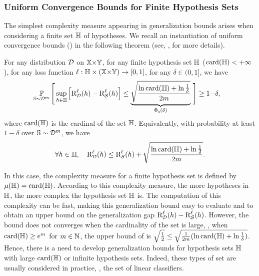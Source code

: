 \subsubsection{Uniform Convergence Bounds for Finite Hypothesis Sets}

The simplest complexity measure appearing in generalization bounds arises when considering a finite set $\mathbb{H}$ of hypotheses.
We recall an instantiation of uniform convergence bounds () in the following theorem (see, \eg, \citet{MohriRostamizadehTalwalkar2012} for more details).

\begin{theorem} For any distribution $\mathcal{D}$ on $\mathbb{X}{\times}\mathbb{Y}$, for any finite hypothesis set $\mathbb{H}$ ($\operatorname{card}(\mathbb{H})<+\infty$), for any loss function $\ell: \mathbb{H}\times(\mathbb{X}{\times}\mathbb{Y})\to [0,1]$, for any $\delta\in(0,1]$, we have 
\begin{align*}
    &\operatorname*{\mathbb{P}}_{\mathbb{S}\sim\mathcal{D}^{m}}\Bigg[\sup_{h\in\mathbb{H}}\left[\text{R}^{\ell}_{\mathcal{D}}(h)-\text{R}^{\ell}_{\mathcal{S}}(h)\right] \le  \underbrace{\sqrt{\frac{\ln\operatorname{card}(\mathbb{H})+\ln\frac{1}{\delta}}{2m}}}_{\Phi_{{\tt u}}(\delta)}\,\Bigg] \ge 1{-}\delta,
\end{align*}
where $\operatorname{card}(\mathbb{H})$ is the cardinal of the set $\mathbb{H}$.
Equivalently, with probability at least $1{-}\delta$ over $\mathbb{S}\sim\mathcal{D}^m$, we have
\begin{align*}
    \forall h\in\mathbb{H},\quad \text{R}^{\ell}_{\mathcal{D}}(h) \le \text{R}^{\ell}_{\mathcal{S}}(h)+ \sqrt{\frac{\ln\operatorname{card}(\mathbb{H})+\ln\frac{1}{\delta}}{2m}}.
\end{align*}
\label{chap:intro:theorem:finite}
\end{theorem}

In this case, the complexity measure for a finite hypothesis set is defined by $\operatorname{\mu}(\mathbb{H})=\operatorname{card}(\mathbb{H})$.
According to this complexity measure, the more hypotheses in $\mathbb{H}$, the more complex the hypothesis set $\mathbb{H}$ is.
The computation of this complexity can be fast, making this generalization bound easy to evaluate and to obtain an upper bound on the generalization gap $\text{R}^{\ell}_{\mathcal{D}}(h)-\text{R}^{\ell}_{\mathcal{S}}(h)$.
However, the bound does not converges when the cardinality of the set is large, \eg, when $\operatorname{card}(\mathbb{H})\ge e^m$ for $m\in\mathbb{N}$, the upper bound of  is  $ \sqrt{\tfrac{1}{2}} \le \sqrt{\tfrac{1}{2m}(\ln\operatorname{card}(\mathbb{H})+\ln\frac{1}{\delta})}$.
Hence, there is a need to develop generalization bounds for hypothesis sets $\mathbb{H}$ with large $\operatorname{card}(\mathbb{H})$ or infinite hypothesis sets.
Indeed, these types of set are usually considered in practice, \eg, the set of linear classifiers.

